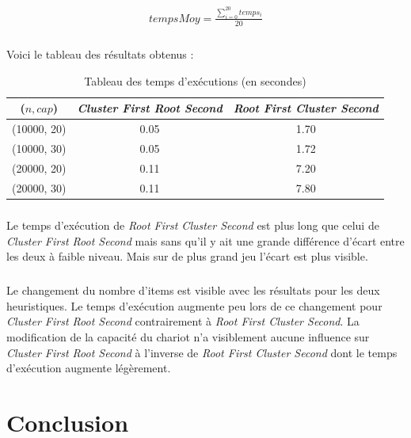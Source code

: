\documentclass[twoside,UTF8]{EPURapport}
\begin{document}
\begin{align}
 tempsMoy = \frac{\displaystyle\sum_{i=0}^{20}temps_{i}}{20}
\end{align}

\paragraph{}
Voici le tableau des résultats obtenus : 

\begin{table}[H]
\centering
\begin{tabular}{|c|c|c|}
\hline 
($n,cap$) & \textit{Cluster First Root Second} & \textit{Root First Cluster Second} \\ 
\hline 
(10000, 20) & 0.05 & 1.70 \\ 
\hline 
(10000, 30) & 0.05 & 1.72 \\
\hline 
(20000, 20) & 0.11 & 7.20 \\ 
\hline 
(20000, 30) & 0.11 & 7.80 \\ 
\hline 
\end{tabular}
\caption{Tableau des temps d'exécutions (en secondes)} 
\end{table}

\paragraph{}
Le temps d'exécution de \textit{Root First Cluster Second} est plus long que celui de \textit{Cluster First Root Second} mais sans qu'il y ait une grande différence d'écart entre les deux à faible niveau. Mais sur de plus grand jeu l'écart est plus visible.

\paragraph{}
Le changement du nombre d'items est visible avec les résultats pour les deux heuristiques. Le temps d'exécution augmente peu lors de ce changement pour \textit{Cluster First Root Second} contrairement à \textit{Root First Cluster Second}. La modification de la capacité du chariot n'a visiblement aucune influence sur \textit{Cluster First Root Second} à l'inverse de \textit{Root First Cluster Second} dont le temps d'exécution augmente légèrement.


\chapter{Conclusion}
\end{document}
